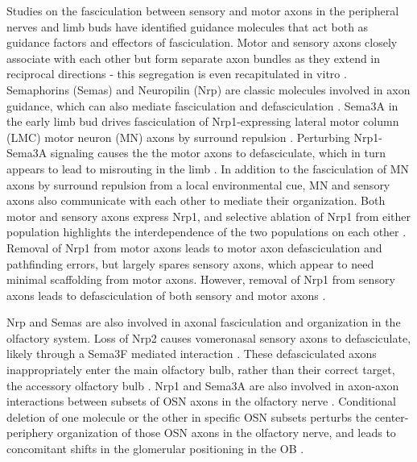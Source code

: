 Studies on the fasciculation between sensory and motor axons in the peripheral nerves and limb buds have identified guidance molecules that act both as guidance factors and effectors of fasciculation.
Motor and sensory axons closely associate with each other but form separate axon bundles as they extend in reciprocal directions - this segregation is even recapitulated in vitro \cite{gallarda2008segregation}.
Semaphorins (Semas) and Neuropilin (Nrp) are classic molecules involved in axon guidance, which can also mediate fasciculation and defasciculation \cite{bashaw2010signaling,kolodkin2011mechanisms,raper2000semaphorins}.
Sema3A in the early limb bud drives fasciculation of Nrp1-expressing lateral motor column (LMC) motor neuron (MN) axons by surround repulsion \cite{huber2005distinct}.
Perturbing Nrp1-Sema3A signaling causes the the motor axons to defasciculate, which in turn appears to lead to misrouting in the limb \cite{huber2005distinct}.
In addition to the fasciculation of MN axons by surround repulsion from a local environmental cue, MN and sensory axons also communicate with each other to mediate their organization.
Both motor and sensory axons express Nrp1, and selective ablation of Nrp1 from either population highlights the interdependence of the two populations on each other \cite{huettl2011npn}.
Removal of Nrp1 from motor axons leads to motor axon defasciculation and pathfinding errors, but largely spares sensory axons, which appear to need minimal scaffolding from motor axons.
However, removal of Nrp1 from sensory axons leads to defasciculation of both sensory and motor axons \cite{huettl2011npn}.

Nrp and Semas are also involved in axonal fasciculation and organization in the olfactory system.
Loss of Nrp2 causes vomeronasal sensory axons to defasciculate, likely through a Sema3F mediated interaction \cite{cloutier2002neuropilin}.
These defasciculated axons inappropriately enter the main olfactory bulb, rather than their correct target, the accessory olfactory bulb \cite{cloutier2002neuropilin}.
Nrp1 and Sema3A are also involved in axon-axon interactions between subsets of OSN axons in the olfactory nerve \cite{imai2009pre}.
Conditional deletion of one molecule or the other in specific OSN subsets perturbs the center-periphery organization of those OSN axons in the olfactory nerve, and leads to concomitant shifts in the glomerular positioning in the OB \cite{imai2009pre}.

